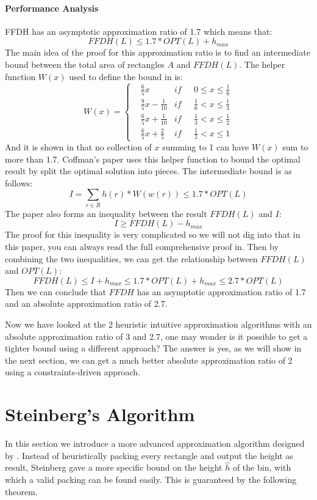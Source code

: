 \documentclass[sigplan,screen,nonacm]{acmart}\settopmatter{printfolios=true,printccs=false,printacmref=false}
\begin{document}
\paragraph{Performance Analysis}
FFDH has an asymptotic approximation ratio of 1.7 which means that:
$$FFDH(L) \leq 1.7*OPT(L) + h_{max}$$
The main idea of the proof for this approximation ratio is to find an intermediate bound between the total area of rectangles $A$ and $FFDH(L)$. The helper function $W(x)$ used to define the bound in\cite{coffman1980performance} is:
$$ W(x)=\left\{
\begin{aligned}
& \frac{6}{5}x  &   if \text{ } & 0 \leq x \leq \frac{1}{6}\\
& \frac{9}{5}x - \frac{1}{10}  &   if \text{ } & \frac{1}{6} < x \leq \frac{1}{3}\\
& \frac{6}{5}x + \frac{1}{10}  &   if \text{ } & \frac{1}{3} < x \leq \frac{1}{2}\\
& \frac{6}{5}x + \frac{2}{5}  &   if \text{ } & \frac{1}{2} < x \leq 1
\end{aligned}
\right.
$$
And it is shown in\cite{garey1976resource} that no collection of $x$ summing to 1 can have $W(x)$ sum to more than 1.7. Coffman's paper\cite{coffman1980performance} uses this helper function to bound the optimal result by split the optimal solution into pieces\cite{coffman1980performance}. The intermediate bound is as follows:
$$I = \sum_{r \in R}h(r)*W(w(r)) \leq 1.7*OPT(L)$$
The paper also forms an inequality between the result $FFDH(L)$ and $I$:
$$I \geq FFDH(L) - h_{max}$$
The proof for this inequality is very complicated so we will not dig into that in this paper, you can always read the full comprehensive proof in\cite{coffman1980performance}. Then by combining the two inequalities, we can get the relationship between $FFDH(L)$ and $OPT(L)$:
$$FFDH(L) \leq I + h_{max} \leq 1.7*OPT(L) + h_{max} \leq 2.7*OPT(L)$$
Then we can conclude that $FFDH$ has an asymptotic approximation ratio of 1.7 and an absolute approximation ratio of 2.7.\par
Now we have looked at the 2 heuristic intuitive approximation algorithms with an absolute approximation ratio of 3 and 2.7, one may wonder is it possible to get a tighter bound using a different approach? The answer is yes, as we will show in the next section, we can get a much better absolute approximation ratio of 2 using a constraints-driven approach.
\section{Steinberg's Algorithm}
\par In this section we introduce a more advanced approximation algorithm designed by \cite{steinberg1997strip}. Instead of heuristically packing every rectangle and output the height as result, Steinberg gave a more specific bound on the height $\hat{h}$ of the bin, with which a valid packing can be found easily. This is guaranteed by the following theorem.
\end{document}
